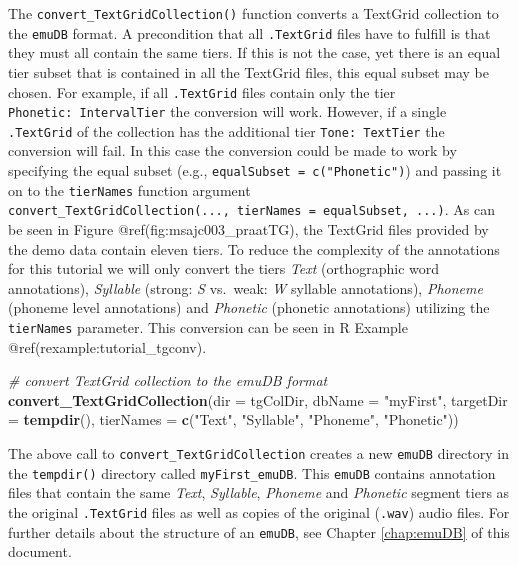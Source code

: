 \documentclass[]{book}
\newenvironment{Shaded}{\begin{snugshade}}{\end{snugshade}}
\newcommand{\KeywordTok}[1]{\textcolor[rgb]{0.13,0.29,0.53}{\textbf{{#1}}}}
\newcommand{\DataTypeTok}[1]{\textcolor[rgb]{0.13,0.29,0.53}{{#1}}}
\newcommand{\StringTok}[1]{\textcolor[rgb]{0.31,0.60,0.02}{{#1}}}
\newcommand{\CommentTok}[1]{\textcolor[rgb]{0.56,0.35,0.01}{\textit{{#1}}}}
\newcommand{\NormalTok}[1]{{#1}}
\theoremstyle{definition}
\theoremstyle{definition}
\theoremstyle{definition}
\theoremstyle{remark}
\begin{document}
The \texttt{convert\_TextGridCollection()} function converts a TextGrid
collection to the \texttt{emuDB} format. A precondition that all
\texttt{.TextGrid} files have to fulfill is that they must all contain
the same tiers. If this is not the case, yet there is an equal tier
subset that is contained in all the TextGrid files, this equal subset
may be chosen. For example, if all \texttt{.TextGrid} files contain only
the tier \texttt{Phonetic:\ IntervalTier} the conversion will work.
However, if a single \texttt{.TextGrid} of the collection has the
additional tier \texttt{Tone:\ TextTier} the conversion will fail. In
this case the conversion could be made to work by specifying the equal
subset (e.g., \texttt{equalSubset\ =\ c("Phonetic")}) and passing it on
to the \texttt{tierNames} function argument
\texttt{convert\_TextGridCollection(...,\ tierNames\ =\ equalSubset,\ ...)}.
As can be seen in Figure @ref(fig:msajc003\_praatTG), the TextGrid files
provided by the demo data contain eleven tiers. To reduce the complexity
of the annotations for this tutorial we will only convert the tiers
\emph{Text} (orthographic word annotations), \emph{Syllable} (strong:
\emph{S} vs.~weak: \emph{W} syllable annotations), \emph{Phoneme}
(phoneme level annotations) and \emph{Phonetic} (phonetic annotations)
utilizing the \texttt{tierNames} parameter. This conversion can be seen
in R Example @ref(rexample:tutorial\_tgconv).

\begin{Shaded}
\begin{Highlighting}[]
\CommentTok{# convert TextGrid collection to the emuDB format}
\KeywordTok{convert_TextGridCollection}\NormalTok{(}\DataTypeTok{dir =} \NormalTok{tgColDir,}
                           \DataTypeTok{dbName =} \StringTok{"myFirst"}\NormalTok{,}
                           \DataTypeTok{targetDir =} \KeywordTok{tempdir}\NormalTok{(),}
                           \DataTypeTok{tierNames =} \KeywordTok{c}\NormalTok{(}\StringTok{"Text"}\NormalTok{, }\StringTok{"Syllable"}\NormalTok{,}
                                         \StringTok{"Phoneme"}\NormalTok{, }\StringTok{"Phonetic"}\NormalTok{))}
\end{Highlighting}
\end{Shaded}

The above call to \texttt{convert\_TextGridCollection} creates a new
\texttt{emuDB} directory in the \texttt{tempdir()} directory called
\texttt{myFirst\_emuDB}. This \texttt{emuDB} contains annotation files
that contain the same \emph{Text}, \emph{Syllable}, \emph{Phoneme} and
\emph{Phonetic} segment tiers as the original \texttt{.TextGrid} files
as well as copies of the original (\texttt{.wav}) audio files. For
further details about the structure of an \texttt{emuDB}, see Chapter
\ref{chap:emuDB} of this document.
\end{document}
